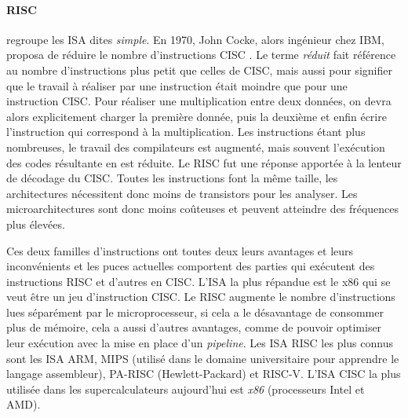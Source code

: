     \paragraph{RISC} regroupe les ISA dites \textit{simple}. En 1970, John Cocke, alors ingénieur chez IBM, proposa de réduire le nombre d'instructions CISC \cite{cocke1990evolution}. Le terme \textit{réduit} fait référence au nombre d'instructions plus petit que celles de CISC, mais aussi pour signifier que le travail à réaliser par une instruction était moindre que pour une instruction CISC. Pour réaliser une multiplication entre deux données, on devra alors explicitement charger la première donnée, puis la deuxième et enfin écrire l'instruction qui correspond à la multiplication. Les instructions étant plus nombreuses, le travail des compilateurs est augmenté, mais souvent l'exécution des codes résultante en est réduite. Le RISC fut une réponse apportée à la lenteur de décodage du CISC.  Toutes les instructions font la même taille, les architectures nécessitent donc moins de transistors pour les analyser. Les microarchitectures sont donc moins coûteuses et peuvent atteindre des fréquences plus élevées.


Ces deux familles d'instructions ont toutes deux leurs avantages et leurs inconvénients et les puces actuelles comportent des parties qui exécutent des instructions RISC et d'autres en CISC. L'ISA la plus répandue est le x86 qui se veut être un jeu d'instruction CISC. Le RISC augmente le nombre d'instructions lues séparément par le microprocesseur, si cela a le désavantage de consommer plus de mémoire, cela a aussi d'autres avantages, comme de pouvoir optimiser leur exécution avec la mise en place d'un \textit{pipeline}. Les ISA RISC les plus connus sont les ISA ARM, MIPS (utilisé dans le domaine universitaire pour apprendre le langage assembleur), PA-RISC (Hewlett-Packard) et RISC-V. L'ISA CISC la plus utilisée dans les supercalculateurs aujourd'hui est \textit{x86} (processeurs Intel et AMD).



